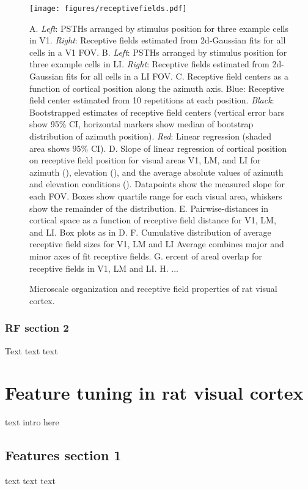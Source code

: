 \documentclass{article}
\begin{document}
\begin{figure}[ht]
  \texttt{[image: figures/receptivefields.pdf]}
  \caption{Microscale organization and receptive field properties of rat visual cortex.}
  \medskip
  \small
  A.  \textit{Left}:  PSTHs arranged by stimulus position for three example cells in V1. \textit{Right}:  Receptive fields estimated from 2d-Gaussian fits for all cells in a V1 FOV.
  B.  \textit{Left}:  PSTHs arranged by stimulus position for three example cells in LI. \textit{Right}:  Receptive fields estimated from 2d-Gaussian fits for all cells in a LI FOV.
  C.  Receptive field centers as a function of cortical position along the azimuth axis. Blue: Receptive field center estimated from 10 repetitions at each position. \textit{Black}: Bootstrapped estimates of receptive field centers (vertical error bars show 95\% CI, horizontal markers show median of bootstrap distribution of azimuth position). \textit{Red}: Linear regression (shaded area shows 95\% CI).
  D.  Slope of linear regression of cortical position on receptive field position for visual areas V1, LM, and LI for azimuth (), elevation (), and the average absolute values of azimuth and elevation conditions (). Datapoints show the measured slope for each FOV.  Boxes show quartile range for each visual area, whiskers show the remainder of the distribution.
  E.  Pairwise-distances in cortical space as a function of receptive field distance for V1, LM, and LI. Box plots as in D. 
  F.  Cumulative distribution of average receptive field sizes for V1, LM and LI  Average combines major and minor axes of fit receptive fields. 
  G.  ercent of areal overlap for receptive fields in V1, LM and LI.  
  H.  ...
  \label{fig:fig2}
\end{figure}

\subsubsection{RF section 2}
Text text text

\section{Feature tuning in rat visual cortex}
text intro here

\subsection{Features section 1}
text text text
\end{document}
